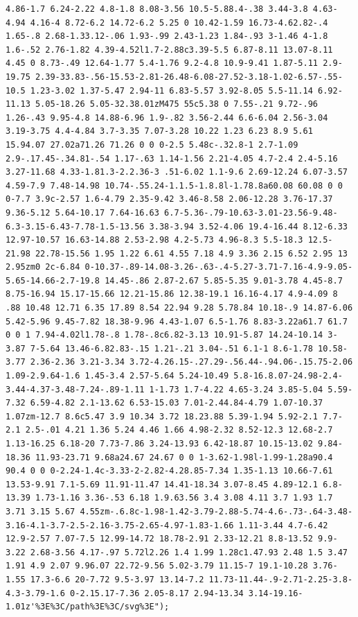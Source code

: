 \documentclass[11pt]{article}
\begin{document}
\begin{enumerate}
\begin{verbatim}
4.86-1.7 6.24-2.22 4.8-1.8 8.08-3.56 10.5-5.88.4-.38 3.44-3.8 4.63-4.94 4.16-4 8.72-6.2 14.72-6.2 5.25 0 10.42-1.59 16.73-4.62.82-.4 1.65-.8 2.68-1.33.12-.06 1.93-.99 2.43-1.23 1.84-.93 3-1.46 4-1.8 1.6-.52 2.76-1.82 4.39-4.52l1.7-2.88c3.39-5.5 6.87-8.11 13.07-8.11 4.45 0 8.73-.49 12.64-1.77 5.4-1.76 9.2-4.8 10.9-9.41 1.87-5.11 2.9-19.75 2.39-33.83-.56-15.53-2.81-26.48-6.08-27.52-3.18-1.02-6.57-.55-10.5 1.23-3.02 1.37-5.47 2.94-11 6.83-5.57 3.92-8.05 5.5-11.14 6.92-11.13 5.05-18.26 5.05-32.38.01zM475 55c5.38 0 7.55-.21 9.72-.96 1.26-.43 9.95-4.8 14.88-6.96 1.9-.82 3.56-2.44 6.6-6.04 2.56-3.04 3.19-3.75 4.4-4.84 3.7-3.35 7.07-3.28 10.22 1.23 6.23 8.9 5.61 15.94.07 27.02a71.26 71.26 0 0 0-2.5 5.48c-.32.8-1 2.7-1.09 2.9-.17.45-.34.81-.54 1.17-.63 1.14-1.56 2.21-4.05 4.7-2.4 2.4-5.16 3.27-11.68 4.33-1.81.3-2.2.36-3 .51-6.02 1.1-9.6 2.69-12.24 6.07-3.57 4.59-7.9 7.48-14.98 10.74-.55.24-1.1.5-1.8.8l-1.78.8a60.08 60.08 0 0 0-7.7 3.9c-2.57 1.6-4.79 2.35-9.42 3.46-8.58 2.06-12.28 3.76-17.37 9.36-5.12 5.64-10.17 7.64-16.63 6.7-5.36-.79-10.63-3.01-23.56-9.48-6.3-3.15-6.43-7.78-1.5-13.56 3.38-3.94 3.52-4.06 19.4-16.44 8.12-6.33 12.97-10.57 16.63-14.88 2.53-2.98 4.2-5.73 4.96-8.3 5.5-18.3 12.5-21.98 22.78-15.56 1.95 1.22 6.61 4.55 7.18 4.9 3.36 2.15 6.52 2.95 13 2.95zm0 2c-6.84 0-10.37-.89-14.08-3.26-.63-.4-5.27-3.71-7.16-4.9-9.05-5.65-14.66-2.7-19.8 14.45-.86 2.87-2.67 5.85-5.35 9.01-3.78 4.45-8.7 8.75-16.94 15.17-15.66 12.21-15.86 12.38-19.1 16.16-4.17 4.9-4.09 8 .88 10.48 12.71 6.35 17.89 8.54 22.94 9.28 5.78.84 10.18-.9 14.87-6.06 5.42-5.96 9.45-7.82 18.38-9.96 4.43-1.07 6.5-1.76 8.83-3.22a61.7 61.7 0 0 1 7.94-4.02l1.78-.8 1.78-.8c6.82-3.13 10.91-5.87 14.24-10.14 3-3.87 7-5.64 13.46-6.82.83-.15 1.21-.21 3.04-.51 6.1-1 8.6-1.78 10.58-3.77 2.36-2.36 3.21-3.34 3.72-4.26.15-.27.29-.56.44-.94.06-.15.75-2.06 1.09-2.9.64-1.6 1.45-3.4 2.57-5.64 5.24-10.49 5.8-16.8.07-24.98-2.4-3.44-4.37-3.48-7.24-.89-1.11 1-1.73 1.7-4.22 4.65-3.24 3.85-5.04 5.59-7.32 6.59-4.82 2.1-13.62 6.53-15.03 7.01-2.44.84-4.79 1.07-10.37 1.07zm-12.7 8.6c5.47 3.9 10.34 3.72 18.23.88 5.39-1.94 5.92-2.1 7.7-2.1 2.5-.01 4.21 1.36 5.24 4.46 1.66 4.98-2.32 8.52-12.3 12.68-2.7 1.13-16.25 6.18-20 7.73-7.86 3.24-13.93 6.42-18.87 10.15-13.02 9.84-18.36 11.93-23.71 9.68a24.67 24.67 0 0 1-3.62-1.98l-1.99-1.28a90.4 90.4 0 0 0-2.24-1.4c-3.33-2-2.82-4.28.85-7.34 1.35-1.13 10.66-7.61 13.53-9.91 7.1-5.69 11.91-11.47 14.41-18.34 3.07-8.45 4.89-12.1 6.8-13.39 1.73-1.16 3.36-.53 6.18 1.9.63.56 3.4 3.08 4.11 3.7 1.93 1.7 3.71 3.15 5.67 4.55zm-.6.8c-1.98-1.42-3.79-2.88-5.74-4.6-.73-.64-3.48-3.16-4.1-3.7-2.5-2.16-3.75-2.65-4.97-1.83-1.66 1.11-3.44 4.7-6.42 12.9-2.57 7.07-7.5 12.99-14.72 18.78-2.91 2.33-12.21 8.8-13.52 9.9-3.22 2.68-3.56 4.17-.97 5.72l2.26 1.4 1.99 1.28c1.47.93 2.48 1.5 3.47 1.91 4.9 2.07 9.96.07 22.72-9.56 5.02-3.79 11.15-7 19.1-10.28 3.76-1.55 17.3-6.6 20-7.72 9.5-3.97 13.14-7.2 11.73-11.44-.9-2.71-2.25-3.8-4.3-3.79-1.6 0-2.15.17-7.36 2.05-8.17 2.94-13.34 3.14-19.16-1.01z'%3E%3C/path%3E%3C/svg%3E");

\end{verbatim}
\end{enumerate}
\end{document}
